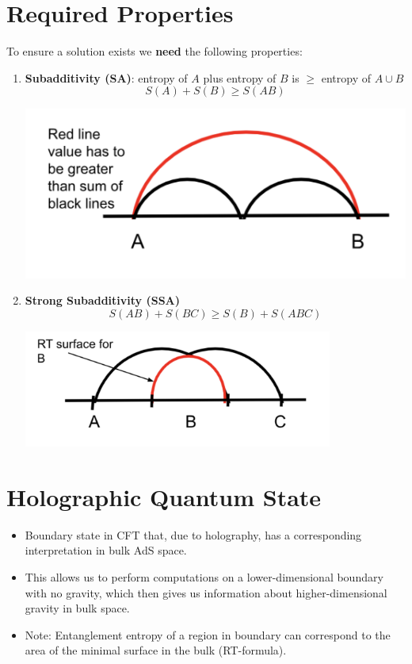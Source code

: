 \documentclass[12pt]{article}
\begin{document}
\section{Required Properties}
To ensure a solution exists we \textbf{need} the following properties:

\begin{enumerate}
    \item \textbf{Subadditivity (SA)}: entropy of \( A \) plus entropy of \( B \) is \( \geq \) entropy of \( A \cup B \)
    \[
    S(A) + S(B) \geq S(AB)
    \]
    \begin{center}
        \includegraphics[width=\linewidth]{subaddivity.png}
    \end{center}
    
    \item \textbf{Strong Subadditivity (SSA)}
    \[
    S(AB) + S(BC) \geq S(B) + S(ABC)
    \]
    \begin{center}
        \includegraphics[width=0.8\textwidth]{strong_subaddivity.png}
    \end{center}
\end{enumerate}

\section*{Holographic Quantum State}
\begin{itemize}
    \item Boundary state in CFT that, due to holography, has a corresponding interpretation in bulk AdS space.
    \item This allows us to perform computations on a lower-dimensional boundary with no gravity, which then gives us information about higher-dimensional gravity in bulk space.
    \item Note: Entanglement entropy of a region in boundary can correspond to the area of the minimal surface in the bulk (RT-formula).
\end{itemize}
\end{document}
